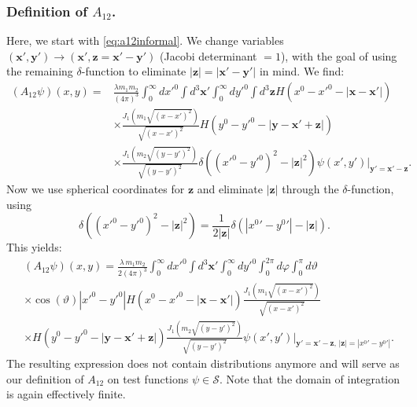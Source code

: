 \documentclass[b5paper,draft,openbib,12pt]{memoir}
\newcommand{\vx}{\mathbf{x}}
\newcommand{\vy}{\mathbf{y}}
\newcommand{\vz}{\mathbf{z}}
\begin{document}
\subsubsection{Definition of $A_{12}$.} Here, we start with 
\eqref{eq:a12informal}. We change variables $(\vx',\vy') 
\rightarrow (\vx',\vz = \vx'-\vy')$ (Jacobi determinant $=1$), with 
the goal of using the remaining $\delta$-function to eliminate 
$|\vz| = |\vx'-\vy'|$ in mind. We find:
\begin{align}
(A_{12} \psi)(x,y) =&\! \frac{\lambda  m_1 m_2}{(4\pi)^3}  \!\int_0^\infty \!\!d{x'}^0 \!\int \!d^3 \vx'\! \int_0^\infty \!\!d{y'}^0 \!\int \!d^3 \vz H(x^0\!-\!{x'}^0\!\!-\!|\vx-\vx'|)  \nonumber\\
&\times \frac{J_1(m_1\sqrt{(x-x')^2})}{\sqrt{(x-x')^2}} H(y^0-{y'}^0-|\vy-\vx'+\vz|)\nonumber\\
&\times  \frac{J_1(m_2\sqrt{(y-y')^2})}{\sqrt{(y-y')^2}}\delta(({x'}^0\!-{y'}^0)^2 -|\vz|^2) \psi(x',y')\Big|_{\vy' = \vx'-\vz}\label{eq:a12informal2}.
\end{align}
Now we use spherical coordinates for $\vz$ and eliminate $|\vz|$ 
through the $\delta$-function, using
\begin{equation}
	 \delta(({x'}^0-{y'}^0)^2 -|\vz|^2) =  \frac{1}{2 |\vz|} \delta(|{x^0}'-{y^0}'|-|\vz|).
\end{equation}
This yields:
\begin{align}
&(A_{12} \psi)(x,y) = \frac{\lambda \, m_1 m_2}{2(4\pi)^3}  \int_0^\infty d{x'}^0 \int d^3 \vx' \int_0^\infty d{y'}^0 \int_0^{2\pi} d\varphi \int_{0}^{\pi} d \vartheta  \nonumber\\
&\times \cos(\vartheta) |{x'}^0-{y'}^0| H(x^0-{x'}^0-|\vx-\vx'|) \frac{J_1(m_1\sqrt{(x-x')^2})}{\sqrt{(x-x')^2}}\nonumber\\
&\times \!H(y^0\!\!-\!{y'}^0\!\!-|\vy\!-\!\vx'\!+\!\vz|) \frac{J_1(m_2\sqrt{(y\!-\!y')^2})}{\sqrt{(y\!-\!y')^2}} \psi(x'\!,y')\Big|_{\vy' = \vx'-\vz, \, |\vz| = |{x^0}'-{y^0}'|}
\label{eq:defa12}.
\end{align}
The resulting expression does not contain distributions anymore and 
will serve as our definition of $A_{12}$ on test functions $\psi 
\in \mathcal{S}$. Note that the domain of integration is again 
effectively finite.

\end{document}
